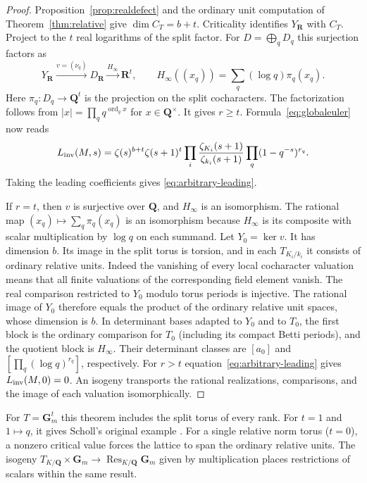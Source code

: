 \documentclass[11pt]{amsart}
\numberwithin{equation}{section}
\theoremstyle{definition}
\theoremstyle{remark}
\newcommand{\Q}{\mathbf Q}
\newcommand{\R}{\mathbf R}
\newcommand{\Gm}{\mathbf G_m}
\newcommand{\Res}{\operatorname{Res}}
\newcommand{\ord}{\operatorname{ord}}
\begin{document}
\begin{proof}
Proposition~\ref{prop:realdefect} and the ordinary unit computation
of Theorem~\ref{thm:relative} give $\dim C_T=b+t$. Criticality
identifies $Y_\R$ with $C_T$. Project to the $t$ real logarithms of the
split factor. For $D=\bigoplus_qD_q$ this surjection factors as
\begin{equation}\label{eq:splitprojection}
 Y_\R \xrightarrow{v=(\nu_q)} D_\R
 \xrightarrow{H_\infty} \R^t,\qquad
 H_\infty((x_q))=\sum_q(\log q)\pi_q(x_q).
\end{equation}
Here $\pi_q:D_q\to\Q^t$ is the projection on the split cocharacters.
The factorization follows from $|x|=\prod_q q^{\ord_q x}$ for
$x\in\Q^\times$. It gives $r\ge t$. Formula~\eqref{eq:globaleuler}
now reads
\[
 L_{\rm inv}(M,s)=\zeta(s)^{b+t}\zeta(s+1)^t
 \prod_i\frac{\zeta_{K_i}(s+1)}{\zeta_{k_i}(s+1)}
 \prod_q(1-q^{-s})^{r_q}.
\]
Taking the leading coefficients gives \eqref{eq:arbitrary-leading}.

If $r=t$, then $v$ is surjective over $\Q$, and $H_\infty$ is an
isomorphism. The rational map $(x_q)\mapsto\sum_q\pi_q(x_q)$ is an
isomorphism because $H_\infty$ is its composite with scalar
multiplication by $\log q$ on each summand. Let $Y_0=\ker v$. It has
dimension $b$. Its image in the split torus is torsion, and in each
$T_{K_i/k_i}$ it consists of ordinary relative units. Indeed the
vanishing of every local cocharacter valuation means that all finite
valuations of the corresponding field element vanish. The real
comparison restricted to $Y_0$ modulo torus periods is injective.
The rational image of $Y_0$ therefore equals the product of the
ordinary relative unit spaces, whose dimension is $b$.
In determinant bases adapted to $Y_0$ and to $T_0$, the first block
is the ordinary comparison for $T_0$ (including its compact Betti
periods), and the quotient block is $H_\infty$. Their determinant
classes are $[a_0]$ and $[\prod_q(\log q)^{r_q}]$, respectively.
For $r>t$ equation~\eqref{eq:arbitrary-leading} gives $L_{\rm inv}(M,0)=0$.
An isogeny transports the rational realizations, comparisons, and
the image of each valuation isomorphically.
\end{proof}

For $T=\Gm^t$ this theorem includes the split torus of every rank.
For $t=1$ and $1\mapsto q$, it gives Scholl's original example
\cite[\S II, example after Conjecture~A]{Scholl}. For a single relative
norm torus ($t=0$), a nonzero critical value forces the lattice to
span the ordinary relative units. The isogeny
$T_{K/\Q}\times\Gm\to\Res_{K/\Q}\Gm$ given by multiplication
places restrictions of scalars within the same result.
\end{document}
